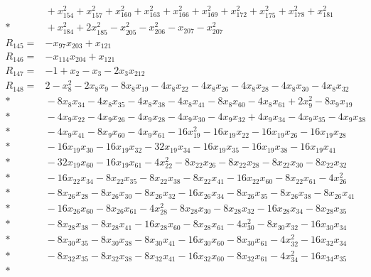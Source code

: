 \begin{align*}
&{} + x_{154}^{2} + x_{157}^{2} + x_{160}^{2} + x_{163}^{2} + x_{166}^{2} + x_{169}^{2} + x_{172}^{2} + x_{175}^{2} + x_{178}^{2} + x_{181}^{2} \\*
&{} + x_{184}^{2} + 2x_{185}^{2} - x_{205}^{2} - x_{206}^{2} - x_{207} - x_{207}^{2} \\[4pt]
R_{145} ={}& -x_{97}x_{203} + x_{121} \\[4pt]
R_{146} ={}& -x_{114}x_{204} + x_{121} \\[4pt]
R_{147} ={}& -1 + x_{2} - x_{3} - 2x_{3}x_{212} \\[4pt]
R_{148} ={}& 2 - x_{8}^{2} - 2x_{8}x_{9} - 8x_{8}x_{19} - 4x_{8}x_{22} - 4x_{8}x_{26} - 4x_{8}x_{28} - 4x_{8}x_{30} - 4x_{8}x_{32} \\*
&{} - 8x_{8}x_{34} - 4x_{8}x_{35} - 4x_{8}x_{38} - 4x_{8}x_{41} - 8x_{8}x_{60} - 4x_{8}x_{61} + 2x_{9}^{2} - 8x_{9}x_{19} \\*
&{} - 4x_{9}x_{22} - 4x_{9}x_{26} - 4x_{9}x_{28} - 4x_{9}x_{30} - 4x_{9}x_{32} + 4x_{9}x_{34} - 4x_{9}x_{35} - 4x_{9}x_{38} \\*
&{} - 4x_{9}x_{41} - 8x_{9}x_{60} - 4x_{9}x_{61} - 16x_{19}^{2} - 16x_{19}x_{22} - 16x_{19}x_{26} - 16x_{19}x_{28} \\*
&{} - 16x_{19}x_{30} - 16x_{19}x_{32} - 32x_{19}x_{34} - 16x_{19}x_{35} - 16x_{19}x_{38} - 16x_{19}x_{41} \\*
&{} - 32x_{19}x_{60} - 16x_{19}x_{61} - 4x_{22}^{2} - 8x_{22}x_{26} - 8x_{22}x_{28} - 8x_{22}x_{30} - 8x_{22}x_{32} \\*
&{} - 16x_{22}x_{34} - 8x_{22}x_{35} - 8x_{22}x_{38} - 8x_{22}x_{41} - 16x_{22}x_{60} - 8x_{22}x_{61} - 4x_{26}^{2} \\*
&{} - 8x_{26}x_{28} - 8x_{26}x_{30} - 8x_{26}x_{32} - 16x_{26}x_{34} - 8x_{26}x_{35} - 8x_{26}x_{38} - 8x_{26}x_{41} \\*
&{} - 16x_{26}x_{60} - 8x_{26}x_{61} - 4x_{28}^{2} - 8x_{28}x_{30} - 8x_{28}x_{32} - 16x_{28}x_{34} - 8x_{28}x_{35} \\*
&{} - 8x_{28}x_{38} - 8x_{28}x_{41} - 16x_{28}x_{60} - 8x_{28}x_{61} - 4x_{30}^{2} - 8x_{30}x_{32} - 16x_{30}x_{34} \\*
&{} - 8x_{30}x_{35} - 8x_{30}x_{38} - 8x_{30}x_{41} - 16x_{30}x_{60} - 8x_{30}x_{61} - 4x_{32}^{2} - 16x_{32}x_{34} \\*
&{} - 8x_{32}x_{35} - 8x_{32}x_{38} - 8x_{32}x_{41} - 16x_{32}x_{60} - 8x_{32}x_{61} - 4x_{34}^{2} - 16x_{34}x_{35} \\*

\end{align*}
